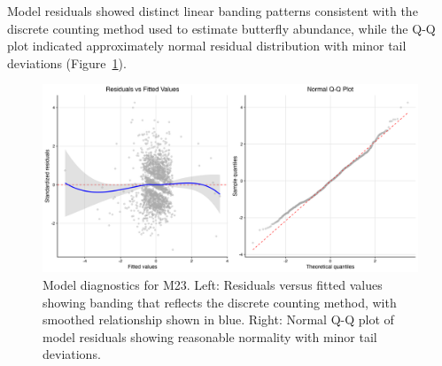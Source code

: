 Model residuals showed distinct linear banding patterns consistent with the discrete counting method used to estimate butterfly abundance, while the Q-Q plot indicated approximately normal residual distribution with minor tail deviations (Figure~\ref{fig:diagnostics}).

\begin{figure}[htbp]
\centering
\includegraphics[width=\textwidth]{figures/results/combined_diagnostics.png}
\caption{Model diagnostics for M23. Left: Residuals versus fitted values showing banding that reflects the discrete counting method, with smoothed relationship shown in blue. Right: Normal Q-Q plot of model residuals showing reasonable normality with minor tail deviations.}\label{fig:diagnostics}
\end{figure}

